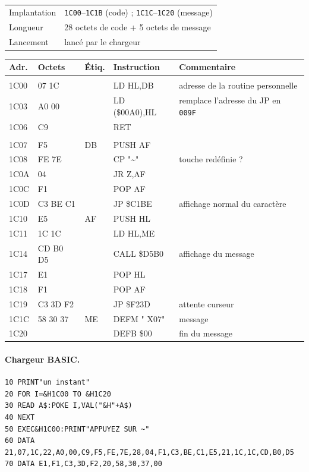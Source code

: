 \documentclass[a4paper,10pt]{article}
\makeatletter
\newcommand{\hex}[1]{\texttt{#1}}
\newcommand{\fiche}[3]{%
  \begin{center}\small
  \begin{tabular}{@{}ll@{}}
  \toprule
  Implantation & #1 \\
  Longueur & #2 \\
  Lancement & #3 \\
  \bottomrule
  \end{tabular}
  \end{center}}
\newenvironment{asm}
  {\small\begin{longtable}{@{}>{\ttfamily}l>{\ttfamily}l>{\ttfamily}l>{\ttfamily}l>{\raggedright\arraybackslash}p{6.2cm}@{}}
   \toprule
   \normalfont\bfseries Adr. & \normalfont\bfseries Octets & \normalfont\bfseries Étiq. & \normalfont\bfseries Instruction & \textbf{Commentaire}\\
   \midrule\endhead
   \bottomrule\endfoot}
  {\end{longtable}}
\makeatother
\begin{document}
\fiche{\hex{1C00}--\hex{1C1B} (code) ; \hex{1C1C}--\hex{1C20} (message)}%
      {28 octets de code + 5 octets de message}{lancé par le chargeur}

\begin{asm}
\multicolumn{5}{@{}l}{\small\itshape Changement du saut (hook)} \\
1C00 & 21 07 1C &    & LD HL,DB       & adresse de la routine personnelle \\
1C03 & 22 A0 00 &    & LD (\$00A0),HL & remplace l'adresse du JP en \hex{009F} \\
1C06 & C9       &    & RET            & \\
\multicolumn{5}{@{}l}{\small\itshape Routine personnelle} \\
1C07 & F5       & DB & PUSH AF        & \\
1C08 & FE 7E    &    & CP "\textasciitilde" & touche redéfinie ? \\
1C0A & 28 04    &    & JR Z,AF        & \\
1C0C & F1       &    & POP AF         & \\
1C0D & C3 BE C1 &    & JP \$C1BE      & affichage normal du caractère \\
1C10 & E5       & AF & PUSH HL        & \\
1C11 & 21 1C 1C &    & LD HL,ME       & \\
1C14 & CD B0 D5 &    & CALL \$D5B0    & affichage du message \\
1C17 & E1       &    & POP HL         & \\
1C18 & F1       &    & POP AF         & \\
1C19 & C3 3D F2 &    & JP \$F23D      & attente curseur \\
1C1C & 20 58 30 37 & ME & DEFM " X07" & message \\
1C20 & 00       &    & DEFB \$00      & fin du message \\
\end{asm}

\paragraph{Chargeur BASIC.}
\begin{verbatim}
10 PRINT"un instant"
20 FOR I=&H1C00 TO &H1C20
30 READ A$:POKE I,VAL("&H"+A$)
40 NEXT
50 EXEC&H1C00:PRINT"APPUYEZ SUR ~"
60 DATA 21,07,1C,22,A0,00,C9,F5,FE,7E,28,04,F1,C3,BE,C1,E5,21,1C,1C,CD,B0,D5
70 DATA E1,F1,C3,3D,F2,20,58,30,37,00
\end{verbatim}
\end{document}
